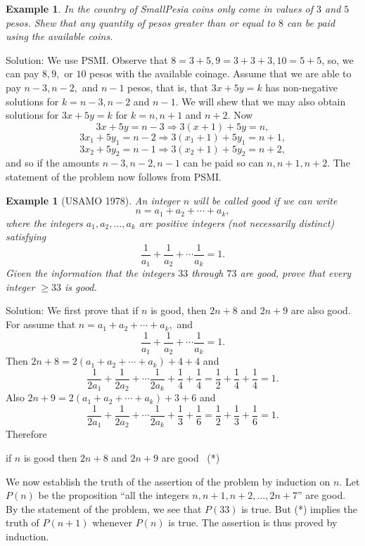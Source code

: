 \documentclass[11pt, openany]{book}
\theoremstyle{change} \theoremheaderfont{\blue\sffamily\bfseries}
\newtheorem{exa}[thm]{Example}
\theoremstyle{nonumberplain} \theoremheaderfont{\sffamily\bfseries}
\newcommand{\í}{\'{\i}}
\begin{document}
\begin{exa}
In the country of SmallPesia coins only come in values of $3$ and
$5$ pesos. Shew that any quantity of pesos greater than or equal
to $8$ can be paid using the available coins.
\end{exa}
Solution: We use PSMI. Observe that $8 = 3 + 5, 9 = 3 + 3 + 3, 10
= 5 + 5$, so, we can pay $8, 9,$ or $10$ pesos with the available
coinage. Assume that we are able to pay $n - 3, n - 2,$ and $n -
1$ pesos, that is, that $3x + 5y = k$ has non-negative solutions
for $k = n - 3, n - 2$ and $n - 1$. We will shew that we may also
obtain solutions for $3x + 5y = k$ for $k = n, n + 1$ and $n + 2$.
Now
$$ 3x + 5y = n - 3 \Longrightarrow 3(x + 1) + 5y = n,$$
$$ 3x_1 + 5y_1 = n - 2 \Longrightarrow 3(x_1 + 1) + 5y_1 = n + 1,$$
$$ 3x_2 + 5y_2 = n - 1 \Longrightarrow 3(x_2 + 1) + 5y_2 = n + 2,$$ and so if the amounts
$n - 3, n - 2, n - 1$ can be paid so can $n, n + 1, n + 2.$ The
statement of the problem now follows from PSMI.


\begin{exa}[USAMO 1978] An integer $n$ will be called {\em good} if we can
write
$$n = a_1 + a_2 + \cdots + a_k,$$where the integers $a_1, a_2, \ldots , a_k$ are positive
integers (not necessarily distinct) satisfying
$$\frac{1}{a_1} + \frac{1}{a_2} + \cdots \frac{1}{a_k} = 1.$$Given the information that the integers
$33$ through $73$ are good, prove that every integer $\geq 33$ is
good.
\end{exa}
Solution: We first prove that if $n$ is good, then $2n + 8$ and
$2n + 9$ are also good. For assume that $n = a_1 + a_2 + \cdots +
a_k,$ and
$$\frac{1}{a_1} + \frac{1}{a_2} + \cdots \frac{1}{a_k} = 1.$$
Then $2n + 8 = 2(a_1 + a_2 + \cdots + a_k) + 4 + 4$ and
$$\frac{1}{2a_1} + \frac{1}{2a_2} + \cdots \frac{1}{2a_k} + \frac{1}{4} + \frac{1}{4}
= \frac{1}{2} + \frac{1}{4} + \frac{1}{4} = 1.$$ Also $2n + 9 =
2(a_1 + a_2 + \cdots + a_k) + 3 + 6$ and
$$\frac{1}{2a_1} + \frac{1}{2a_2} + \cdots \frac{1}{2a_k} + \frac{1}{3} + \frac{1}{6}
= \frac{1}{2} + \frac{1}{3} + \frac{1}{6} = 1.$$ Therefore
\begin{center}
if $n$ is good then $2n + 8$ and $2n + 9$ are good \ (*)
 \end{center}
We now establish the truth of the assertion of the problem by
induction on $n$. Let $P(n)$ be the proposition ``all the integers
$n, n + 1, n + 2, \ldots , 2n + 7$'' are good. By the statement of
the problem, we see that $P(33)$ is true. But (*) implies the
truth of $P(n + 1)$ whenever $P(n)$ is true. The assertion is thus
proved by induction.
\end{document}
